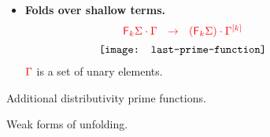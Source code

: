 \begin{figure}
{\begin{minipage}{1\linewidth}
\begin{itemize}
$$\begin{array}{c}
 {\texttt{[image: shallow-fold-distrib]}} 
\end{array}
$$
\item \textbf{Folds over shallow terms.} 
$$
\begin{array}{c}
 {\color{red}{{\color{red}{\mathsf F_{k}}}\Sigma\cdot \Gamma\ \ \to \ \ ({\color{red}{\mathsf F_{k}}}\Sigma) \cdot \Gamma^{{\color{red}{[k]}}}}}\\[5pt]
 {\texttt{[image: last-prime-function]}} 
\end{array}
$$
${\color{red}{\Gamma}}$ is a set of unary elements.
\end{itemize}
\end{minipage}
}
\caption{Additional distributivity prime functions.} \label{fig:additional-distrib-prime}
\end{figure}

\begin{figure}
\caption{Weak forms of unfolding.}\label{fig:weak-unfolding}
\end{figure}